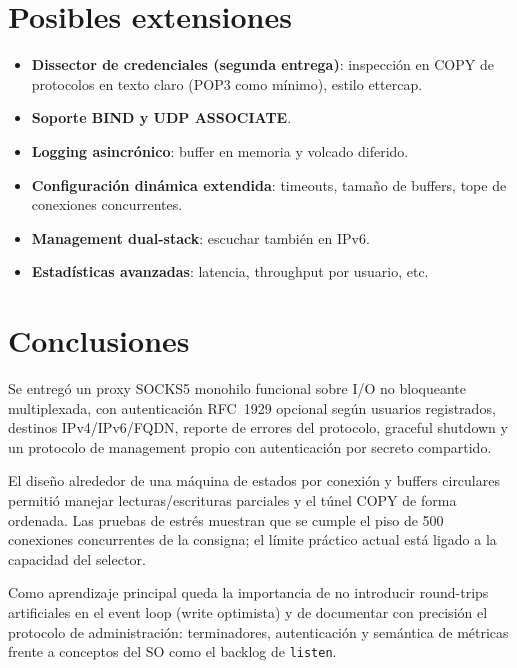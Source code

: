 \documentclass[12pt,a4paper]{article}
\begin{document}
\section{Posibles extensiones}

\begin{itemize}
    \item \textbf{Dissector de credenciales (segunda entrega)}: inspección en COPY
          de protocolos en texto claro (POP3 como mínimo), estilo ettercap.
    \item \textbf{Soporte BIND y UDP ASSOCIATE}.
    \item \textbf{Logging asincrónico}: buffer en memoria y volcado diferido.
    \item \textbf{Configuración dinámica extendida}: timeouts, tamaño de buffers,
          tope de conexiones concurrentes.
    \item \textbf{Management dual-stack}: escuchar también en IPv6.
    \item \textbf{Estadísticas avanzadas}: latencia, throughput por usuario, etc.
\end{itemize}

\section{Conclusiones}

Se entregó un proxy SOCKS5 monohilo funcional sobre I/O no bloqueante multiplexada,
con autenticación RFC~1929 opcional según usuarios registrados, destinos IPv4/IPv6/FQDN,
reporte de errores del protocolo, graceful shutdown y un protocolo de management
propio con autenticación por secreto compartido.

El diseño alrededor de una máquina de estados por conexión y buffers circulares
permitió manejar lecturas/escrituras parciales y el túnel COPY de forma ordenada.
Las pruebas de estrés muestran que se cumple el piso de 500 conexiones concurrentes
de la consigna; el límite práctico actual está ligado a la capacidad del selector.

Como aprendizaje principal queda la importancia de no introducir round-trips
artificiales en el event loop (write optimista) y de documentar con precisión el
protocolo de administración: terminadores, autenticación y semántica de métricas
frente a conceptos del SO como el backlog de \texttt{listen}.

\end{document}
